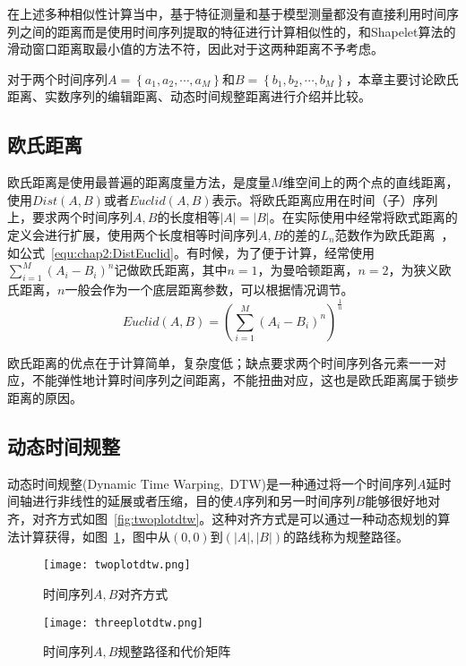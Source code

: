 在上述多种相似性计算当中，基于特征测量和基于模型测量都没有直接利用时间序列之间的距离而是使用时间序列提取的特征进行计算相似性的，和Shapelet算法的滑动窗口距离取最小值的方法不符，因此对于这两种距离不予考虑。

对于两个时间序列$A=\left\lbrace a_1,a_2,\cdots,a_M\right\rbrace$和$B=\left\lbrace b_1,b_2,\cdots,b_M\right\rbrace$，本章主要讨论欧氏距离、实数序列的编辑距离、动态时间规整距离进行介绍并比较。

\subsection{欧氏距离}
欧氏距离是使用最普遍的距离度量方法，是度量$M$维空间上的两个点的直线距离，使用$Dist(A,B)$或者$Euclid(A,B)$表示。将欧氏距离应用在时间（子）序列上，要求两个时间序列$A,B$的长度相等$|A|=|B|$。在实际使用中经常将欧式距离的定义会进行扩展，使用两个长度相等时间序列$A,B$的差的$L_n$范数作为欧氏距离~\cite{serra2014empirical}，如公式~\ref{equ:chap2:DistEuclid}。有时候，为了便于计算，经常使用$\sum_{i=1}^{M}(A_i-B_i)^n$记做欧氏距离，其中$n=1$，为曼哈顿距离，$n=2$，为狭义欧氏距离，$n$一般会作为一个底层距离参数，可以根据情况调节。
\begin{equation}
\label{equ:chap2:DistEuclid}
Euclid(A,B) = (\sum_{i=1}^{M}(A_i-B_i)^n)^{\frac{1}{n}}
\end{equation}

欧氏距离的优点在于计算简单，复杂度低；缺点要求两个时间序列各元素一一对应，不能弹性地计算时间序列之间距离，不能扭曲对应，这也是欧氏距离属于锁步距离的原因。

%

\subsection{动态时间规整}
\label{cha:chap02:dtw}


动态时间规整\cite{muller2007dynamic}(Dynamic Time Warping,~DTW)是一种通过将一个时间序列$A$延时间轴进行非线性的延展或者压缩，目的使$A$序列和另一时间序列$B$能够很好地对齐，对齐方式如图~\ref{fig:twoplotdtw}。这种对齐方式是可以通过一种动态规划的算法计算获得，如图~\ref{fig:threeplotdtw}，图中从$(0,0)$到$(|A|,|B|)$的路线称为规整路径。

\begin{figure}
	\begin{minipage}{0.48\textwidth}
		\centering
		\texttt{[image: twoplotdtw.png]}
		\caption{时间序列$A,B$对齐方式}
		\label{fig:twoplotdtw}
	\end{minipage}\hfill
	\begin{minipage}{0.48\textwidth}
		\centering
		\texttt{[image: threeplotdtw.png]}
		\caption{时间序列$A,B$规整路径和代价矩阵}
		\label{fig:threeplotdtw}
	\end{minipage}
\end{figure}

